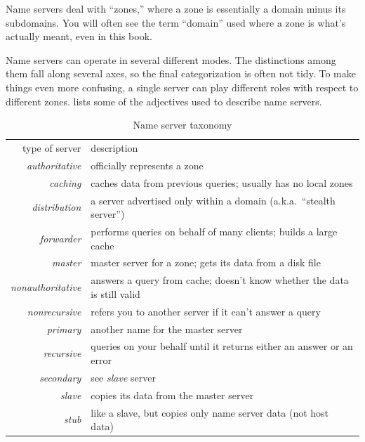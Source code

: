 Name servers deal with ``zones,'' where a zone is essentially a domain minus its subdomains.
You will often see the term ``domain'' used where a zone is what's actually meant, even in this book.

Name servers can operate in several different modes. The distinctions
among them fall along several axes, so the final categorization is often
not tidy. To make things even more confusing, a single server can play
different roles with respect to different zones.
 lists some of the adjectives used to describe name servers.


\begin{table}
   \centering
   \begin{tabular}{rp{}}
   type of server             & description\\[1ex]
   \textit{authoritative}     & officially represents a zone\\
   \textit{caching}           & caches data from previous queries; usually has no local zones\\
   \textit{distribution}      & a server advertised only within a domain (a.k.a.~``stealth server'')\\
   \textit{forwarder}         & performs queries on behalf of many clients; builds a large cache\\
   \textit{master}            & master server for a zone; gets its data from a disk file\\
   \textit{nonauthoritative}  & answers a query from cache; doesn't know whether the data is still valid\\
   \textit{nonrecursive}      & refers you to another server if it can't answer a query\\
   \textit{primary}           & another name for the master server\\
   \textit{recursive}         & queries on your behalf until it returns either an answer or an error\\
   \textit{secondary}         & see \emph{slave} server\\
   \textit{slave}             & copies its data from the master server\\
   \textit{stub}              & like a slave, but copies only name server data (not host data)\\
   \end{tabular}
   \caption{Name server taxonomy}
   \label{tab:ns-taxonomy}
\end{table}


